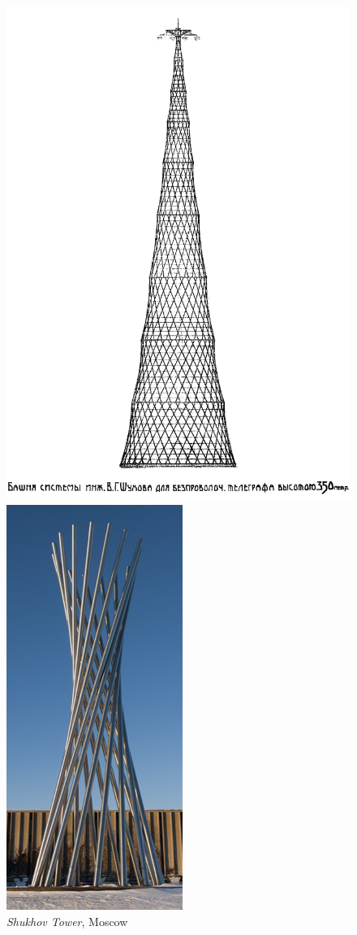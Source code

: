 \begin{frame}
\begin{figure}[!htb]
\begin{minipage}{0.3\textwidth}
        \includegraphics[height=0.5\textheight]{resources/shukhov-2.jpg}
        \caption{\emph{Shukhov Tower}, Moscow}
    \end{minipage}%
    \begin{minipage}{.3\textwidth}
        \centering
        \includegraphics[height=0.5\textheight]{resources/tractricious.jpg}

\end{minipage}
\end{figure}
\end{frame}
